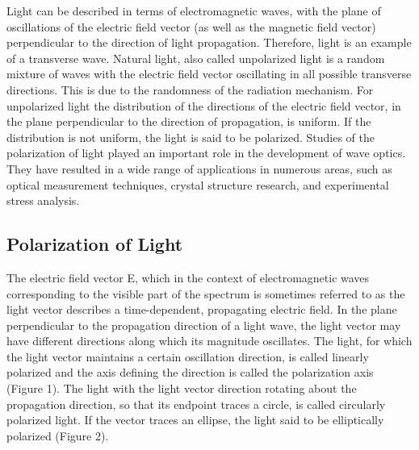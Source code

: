 \documentclass{article}
\begin{document}
Light can be described in terms of electromagnetic waves, with the plane of oscillations of the electric field vector (as well as the magnetic field vector) perpendicular to the direction of light propagation. Therefore, light is an example of a transverse wave. Natural light, also called
unpolarized light is a random mixture of waves with the electric field vector oscillating in all possible transverse directions. This is due to the randomness of the radiation mechanism. For unpolarized light the distribution of the directions of the electric field vector, in the plane perpendicular to the direction of propagation, is uniform. If the distribution is not uniform, the light is said to be polarized. Studies of the polarization of light played an important role in the development of wave optics. They have resulted in a wide range of applications in numerous areas, such as optical measurement techniques, crystal structure research, and experimental stress analysis.

\subsection{Polarization of Light}
The electric field vector E, which in the context of electromagnetic waves corresponding to the visible part of the spectrum is sometimes referred to as the light vector describes a time-dependent, propagating electric field. In the plane perpendicular to the propagation direction of a light wave, the light vector may have different directions along which its magnitude oscillates. The light, for which the light vector maintains a certain oscillation direction, is called linearly polarized and the axis defining the direction is called the polarization axis (Figure 1).
The light with the light vector direction rotating about the propagation direction, so that its endpoint traces a circle, is called circularly polarized light. If the vector traces an ellipse, the light said to be elliptically polarized (Figure 2).
\end{document}
